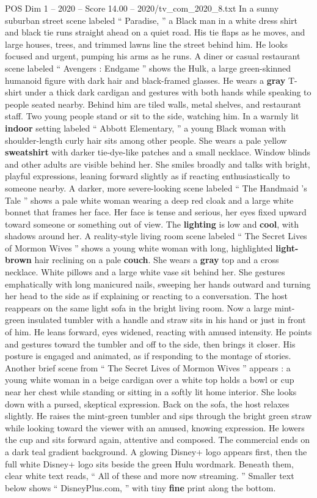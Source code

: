 \begin{textsample}{POS Dim 1 – 2020 – Score 14.00 – 2020/tv\_com\_2020\_8.txt}
In a sunny suburban street scene labeled “ Paradise, ” a Black man in a white dress shirt and black tie runs straight ahead on a quiet road.
His tie flaps as he moves, and large houses, trees, and trimmed lawns line the street behind him.
He looks focused and urgent, pumping his arms as he runs.
A diner or casual restaurant scene labeled “ Avengers : Endgame ” shows the Hulk, a large green-skinned humanoid figure with dark hair and black-framed glasses.
He wears a \textbf{gray} T-shirt under a thick dark cardigan and gestures with both hands while speaking to people seated nearby.
Behind him are tiled walls, metal shelves, and restaurant staff.
Two young people stand or sit to the side, watching him.
In a warmly lit \textbf{indoor} setting labeled “ Abbott Elementary, ” a young Black woman with shoulder-length curly hair sits among other people.
She wears a pale yellow \textbf{sweatshirt} with darker tie-dye-like patches and a small necklace.
Window blinds and other adults are visible behind her.
She smiles broadly and talks with bright, playful expressions, leaning forward slightly as if reacting enthusiastically to someone nearby.
A darker, more severe-looking scene labeled “ The Handmaid ’s Tale ” shows a pale white woman wearing a deep red cloak and a large white bonnet that frames her face.
Her face is tense and serious, her eyes fixed upward toward someone or something out of view.
The \textbf{lighting} is low and \textbf{cool}, with shadows around her.
A reality-style living room scene labeled “ The Secret Lives of Mormon Wives ” shows a young white woman with long, highlighted \textbf{light-brown} hair reclining on a pale \textbf{couch}.
She wears a \textbf{gray} top and a cross necklace.
White pillows and a large white vase sit behind her.
She gestures emphatically with long manicured nails, sweeping her hands outward and turning her head to the side as if explaining or reacting to a conversation.
The host reappears on the same light sofa in the bright living room.
Now a large mint-green insulated tumbler with a handle and straw sits in his hand or just in front of him.
He leans forward, eyes widened, reacting with amused intensity.
He points and gestures toward the tumbler and off to the side, then brings it closer.
His posture is engaged and animated, as if responding to the montage of stories.
Another brief scene from “ The Secret Lives of Mormon Wives ” appears : a young white woman in a beige cardigan over a white top holds a bowl or cup near her chest while standing or sitting in a softly lit home interior.
She looks down with a pursed, skeptical expression.
Back on the sofa, the host relaxes slightly.
He raises the mint-green tumbler and sips through the bright green straw while looking toward the viewer with an amused, knowing expression.
He lowers the cup and sits forward again, attentive and composed.
The commercial ends on a dark teal gradient background.
A glowing Disney+ logo appears first, then the full white Disney+ logo sits beside the green Hulu wordmark.
Beneath them, clear white text reads, “ All of these and more now streaming. ” Smaller text below shows “ DisneyPlus.com, ” with tiny \textbf{fine} print along the bottom.


\end{textsample}
